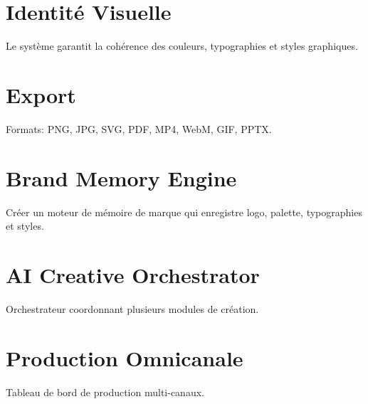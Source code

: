 \documentclass[12pt,a4paper,oneside]{book}
\begin{document}
\chapter{Identité Visuelle}
Le système garantit la cohérence des couleurs, typographies et styles graphiques.

\chapter{Export}
Formats: PNG, JPG, SVG, PDF, MP4, WebM, GIF, PPTX.

\chapter{Brand Memory Engine}
Créer un moteur de mémoire de marque qui enregistre logo, palette, typographies et styles.

\chapter{AI Creative Orchestrator}
Orchestrateur coordonnant plusieurs modules de création.

\chapter{Production Omnicanale}
Tableau de bord de production multi-canaux.
\end{document}

